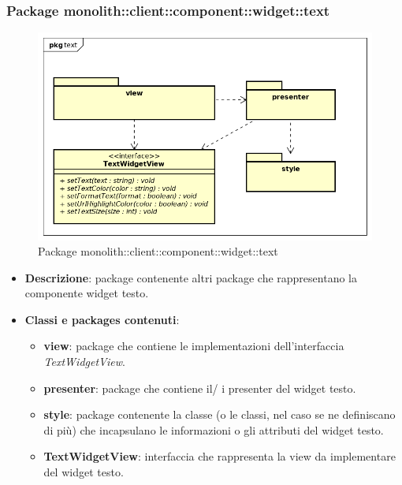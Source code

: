 \subsubsection{Package monolith::client::component::widget::text}
\label{Package monolith::client::component::widget::text}
\begin{figure}[H]
	\centering
	\includegraphics[scale=0.5]{Sezioni/Packages/SDK/text.png}
	\caption{Package monolith::client::component::widget::text}
\end{figure}
\begin{itemize}
\item \textbf{Descrizione}: package contenente altri package che rappresentano la componente widget testo.
\item \textbf{Classi e packages contenuti}:
\begin{itemize}
\item \textbf{view}: package che contiene le implementazioni dell'interfaccia \textit{TextWidgetView}.
\item \textbf{presenter}: package che contiene il/ i presenter del widget testo.
\item \textbf{style}: package contenente la classe (o le classi, nel caso se ne definiscano di più) che incapsulano le informazioni o gli attributi del widget testo.
\item \textbf{TextWidgetView}: interfaccia che rappresenta la view da implementare del widget testo.
\end{itemize}
\end{itemize}



































